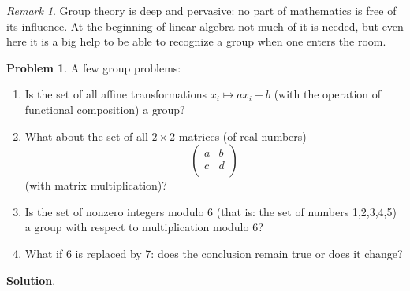 \documentclass[english,notitlepage,smartquotes]{hgbreport}
\theoremstyle{definition}
\theoremstyle{definition}
\newtheorem{problem}{Problem}
\theoremstyle{remark}
\newtheorem*{remark}{Remark}
\theoremstyle{definition}
\theoremstyle{plain}
\theoremstyle{definition}
\begin{document}
\begin{remark}
Group theory is deep and pervasive: no part of mathematics is free of its influence. At the beginning of linear algebra not much of it is needed, but even here it is a big help to be able to recognize a group when one enters the room.
\end{remark}
\begin{problem}
\label{pr:groupexs}
A few group problems:
\begin{enumerate}
\item Is the set of all affine transformations $x_i\mapsto ax_i+b$ (with the operation of functional composition) a group?
\item What about the set of all $2\times 2$ matrices (of real numbers)
$$
  \begin{pmatrix}
    a & b\\
    c & d\\
  \end{pmatrix}
$$ (with matrix multiplication)?
\item Is the set of nonzero integers modulo 6 (that is: the set of numbers 1,2,3,4,5) a group with respect to multiplication modulo 6?
\item  What if 6 is replaced by 7: does the conclusion remain true or does it change?
\end{enumerate}
\end{problem}
\textbf{Solution}. 
\end{document}
